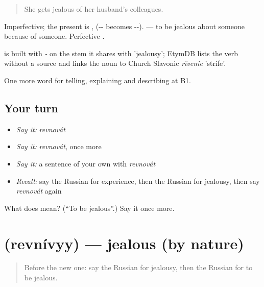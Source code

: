 \begin{quote}
She gets jealous of her husband's colleagues.
\end{quote}

Imperfective; the present is ,  (-- becomes --). \emph{   } — to be jealous about someone because of someone. Perfective .

\begin{cousinweb}
\emph{} is built with \emph{-} on the stem it shares with \emph{} 'jealousy'; EtymDB lists the verb without a source and links the noun to Church Slavonic \emph{rĭvenie} 'strife'.
\end{cousinweb}

\begin{grammarlens}[title={What you've built}]
One more word for telling, explaining and describing at B1.
\end{grammarlens}

\subsection*{Your turn}
\begin{itemize}
\raggedright
  \item \emph{Say it:} \emph{revnovát}
  \item \emph{Say it:} \emph{revnovát}, once more
  \item \emph{Say it:} a sentence of your own with \emph{revnovát}
  \item \emph{Recall:} say the Russian for experience, then the Russian for jealousy, then say \emph{revnovát} again
\end{itemize}

\begin{tcolorbox}[breakable,colback=teal!4,colframe=teal!35!black,title={Before you move on}]
What does  mean? (\textquotedblleft{}To be jealous\textquotedblright{}.) Say it once more.
\end{tcolorbox}
\section[\texorpdfstring{\ru{ревнивый} (revnívyy)}{ревнивый (revnívyy)}]{ (revnívyy) — jealous (by nature)}

\label{lesson:RU-C469-revnivyy}



\begin{quote}
Before the new one: say the Russian for jealousy, then the Russian for to be jealous.
\end{quote}

